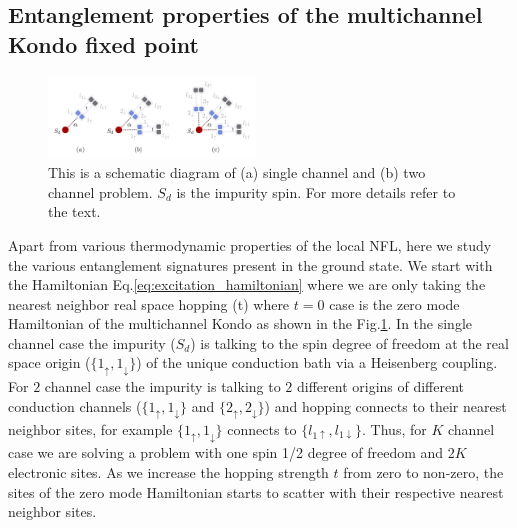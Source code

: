 \documentclass[reprint,prb,superscriptaddress]{revtex4-2}
\begin{document}
\subsection{Entanglement properties of the multichannel Kondo fixed point}
\begin{figure}[!htpb]
\includegraphics[width=0.49\textwidth]{plt/hopping_fock_states}
\caption{This is a schematic diagram of (a) single channel and (b) two channel problem. $S_d$ is the impurity spin. For more details refer to the text.}
\label{fig:schematic_hopping}
\end{figure}


\noindent Apart from various thermodynamic properties of the local NFL, here we study the various entanglement signatures present in the ground state. We start with the Hamiltonian Eq.\eqref{eq:excitation_hamiltonian} where we are only taking the nearest neighbor real space hopping (t) where $t=0$ case is the zero mode Hamiltonian of the multichannel Kondo as shown in the Fig.\ref{fig:schematic_hopping}. In the single channel case the impurity ($S_d$) is talking to the spin degree of freedom at the real space origin ($\{1_{\uparrow},1_{\downarrow}\}$) of the unique conduction bath via a Heisenberg coupling. For $2$ channel case the impurity is talking to $2$ different origins of different conduction channels ($\{1_{\uparrow},1_{\downarrow}\}$ and $\{2_{\uparrow},2_{\downarrow}\}$) and hopping connects to their nearest neighbor sites, for example $\{1_{\uparrow},1_{\downarrow}\}$ connects to $\{l_{1\uparrow},l_{1\downarrow}\}$. Thus, for $K$ channel case we are solving a problem with one spin 1/2 degree of freedom and $2K$ electronic sites. As we increase the hopping strength $t$ from zero to non-zero, the sites of the zero mode Hamiltonian starts to scatter with their respective nearest neighbor sites.
\end{document}
